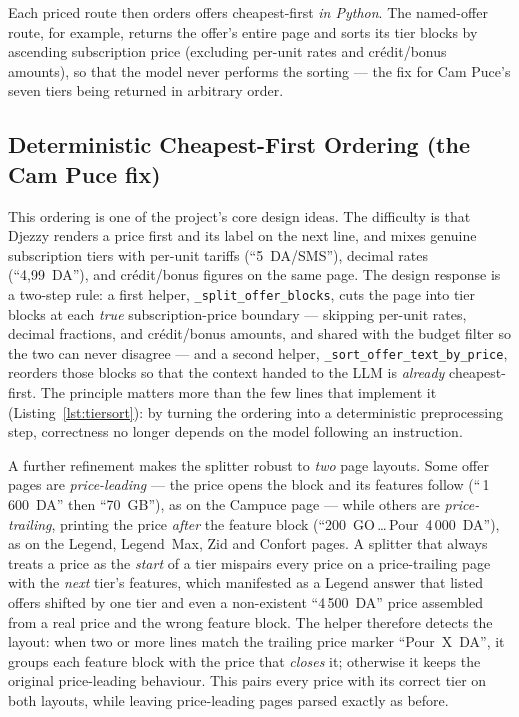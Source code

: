 \documentclass[12pt, a4paper]{report}
\newcommand{\humantext}[1]{#1}      %
\begin{document}
\humantext{Each priced route then orders offers cheapest-first \emph{in Python}. The named-offer route, for example, returns the offer's entire page and sorts its tier blocks by ascending subscription price (excluding per-unit rates and crédit/bonus amounts), so that the model never performs the sorting --- the fix for Cam Puce's seven tiers being returned in arbitrary order.}

\subsection{Deterministic Cheapest-First Ordering (the Cam Puce fix)}
\humantext{This ordering is one of the project's core design ideas. The difficulty is that Djezzy renders a price first and its label on the next line, and mixes genuine subscription tiers with per-unit tariffs (``5~DA/SMS''), decimal rates (``4,99~DA''), and crédit/bonus figures on the same page. The design response is a two-step rule: a first helper, \texttt{\_split\_offer\_blocks}, cuts the page into tier blocks at each \emph{true} subscription-price boundary --- skipping per-unit rates, decimal fractions, and crédit/bonus amounts, and shared with the budget filter so the two can never disagree --- and a second helper, \texttt{\_sort\_offer\_text\_by\_price}, reorders those blocks so that the context handed to the LLM is \emph{already} cheapest-first. The principle matters more than the few lines that implement it (Listing~\ref{lst:tiersort}): by turning the ordering into a deterministic preprocessing step, correctness no longer depends on the model following an instruction.}

\humantext{A further refinement makes the splitter robust to \emph{two} page layouts. Some offer pages are \emph{price-leading} --- the price opens the block and its features follow (``\,1\,600~DA'' then ``70~GB''), as on the Campuce page --- while others are \emph{price-trailing}, printing the price \emph{after} the feature block (``200~GO\,\dots\,Pour~4\,000~DA''), as on the Legend, Legend~Max, Zid and Confort pages. A splitter that always treats a price as the \emph{start} of a tier mispairs every price on a price-trailing page with the \emph{next} tier's features, which manifested as a Legend answer that listed offers shifted by one tier and even a non-existent ``4\,500~DA'' price assembled from a real price and the wrong feature block. The helper therefore detects the layout: when two or more lines match the trailing price marker ``Pour~X~DA'', it groups each feature block with the price that \emph{closes} it; otherwise it keeps the original price-leading behaviour. This pairs every price with its correct tier on both layouts, while leaving price-leading pages parsed exactly as before.}
\end{document}
